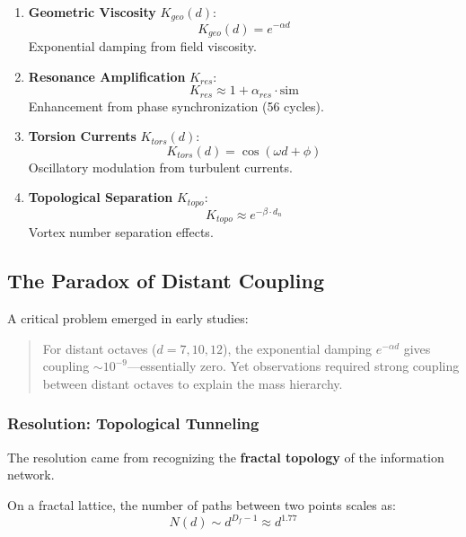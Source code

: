 \documentclass[11pt,a4paper]{book}
\theoremstyle{remark}
\begin{document}
\begin{enumerate}
    \item \textbf{Geometric Viscosity} $K_{geo}(d)$:
    \begin{equation}
    K_{geo}(d) = e^{-\alpha d}
    \end{equation}
    Exponential damping from field viscosity.
    
    \item \textbf{Resonance Amplification} $K_{res}$:
    \begin{equation}
    K_{res} \approx 1 + \alpha_{res} \cdot \text{sim}
    \end{equation}
    Enhancement from phase synchronization (56 cycles).
    
    \item \textbf{Torsion Currents} $K_{tors}(d)$:
    \begin{equation}
    K_{tors}(d) = \cos(\omega d + \phi)
    \end{equation}
    Oscillatory modulation from turbulent currents.
    
    \item \textbf{Topological Separation} $K_{topo}$:
    \begin{equation}
    K_{topo} \approx e^{-\beta \cdot d_n}
    \end{equation}
    Vortex number separation effects.
\end{enumerate}

\subsection{The Paradox of Distant Coupling}

A critical problem emerged in early studies:

\begin{quote}
For distant octaves ($d = 7, 10, 12$), the exponential damping $e^{-\alpha d}$ gives coupling $\sim 10^{-9}$—essentially zero. Yet observations required strong coupling between distant octaves to explain the mass hierarchy.
\end{quote}

\subsubsection{Resolution: Topological Tunneling}

The resolution came from recognizing the \textbf{fractal topology} of the information network.

On a fractal lattice, the number of paths between two points scales as:
\begin{equation}
N(d) \sim d^{D_f - 1} \approx d^{1.77}
\end{equation}
\end{document}
